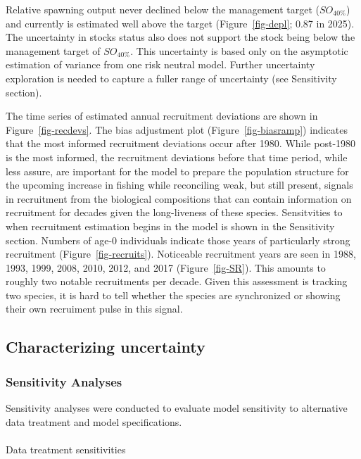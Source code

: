 \documentclass[
]{scrartcl}
\makeatletter
\let\oldparagraph\paragraph
\renewcommand{\paragraph}{
    \@ifstar
      \xxxParagraphStar
      \xxxParagraphNoStar
  }
\newcommand{\xxxParagraphStar}[1]{\oldparagraph*{#1}\mbox{}}
\newcommand{\xxxParagraphNoStar}[1]{\oldparagraph{#1}\mbox{}}
\makeatother
\begin{document}
Relative spawning output never declined below the management target
(\(SO_{40\%}\)) and currently is estimated well above the target
(Figure~\ref{fig-depl}; 0.87 in 2025). The uncertainty in stocks status
also does not support the stock being below the management target of
\(SO_{40\%}\). This uncertainty is based only on the asymptotic
estimation of variance from one risk neutral model. Further uncertainty
exploration is needed to capture a fuller range of uncertainty (see
Sensitivity section).

The time series of estimated annual recruitment deviations are shown in
Figure~\ref{fig-recdevs}. The bias adjustment plot
(Figure~\ref{fig-biasramp}) indicates that the most informed recruitment
deviations occur after 1980. While post-1980 is the most informed, the
recruitment deviations before that time period, while less assure, are
important for the model to prepare the population structure for the
upcoming increase in fishing while reconciling weak, but still present,
signals in recruitment from the biological compositions that can contain
information on recruitment for decades given the long-liveness of these
species. Sensitvities to when recruitment estimation begins in the model
is shown in the Sensitivity section. Numbers of age-0 individuals
indicate those years of particularly strong recruitment
(Figure~\ref{fig-recruits}). Noticeable recruitment years are seen in
1988, 1993, 1999, 2008, 2010, 2012, and 2017 (Figure~\ref{fig-SR}). This
amounts to roughly two notable recruitments per decade. Given this
assessment is tracking two species, it is hard to tell whether the
species are synchronized or showing their own recruiment pulse in this
signal.

\newpage{}

\subsection{Characterizing
uncertainty}\label{characterizing-uncertainty}

\subsubsection{Sensitivity Analyses}\label{sec-assmt-sens}

Sensitivity analyses were conducted to evaluate model sensitivity to
alternative data treatment and model specifications.

\paragraph{Data treatment
sensitivities}\label{data-treatment-sensitivities}
\end{document}
